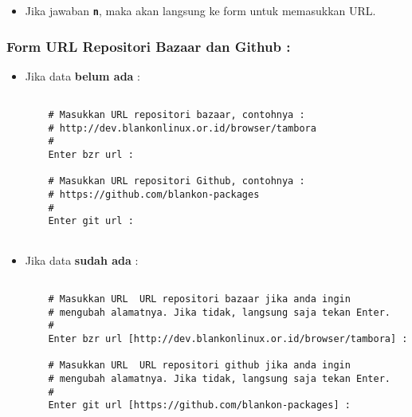 {\begin{itemize}
	Setelah form disini, maka akan tampilk hasil \textbf{Generate Key GnuPG} :
	
	\begin{lstlisting}[language=ShellBash]
	You want to enter different passphrase GnuPG ? [y or n] y
	Enter passphrase : pub   1024R/243741DF 2017-06-12
	Key fingerprint = 8891 3EF3 6E21 C298 B7B6  0F0A 1380 3397 2437 41DF
	uid                  Achmad Yusri Afandi <yusrideb@cpan.org>
	sub   1024R/EF69A466 2017-06-12
	\end{lstlisting}
	
	\item Jika jawaban \textbf{\texttt{n}}, maka akan langsung ke form untuk memasukkan URL.
	
\end{itemize}

\subsubsection{Form URL Repositori Bazaar dan Github :}

\begin{itemize}
	\item Jika data \textbf{belum ada} :
	
	\begin{lstlisting}[language=ShellBash2]
	
	# Masukkan URL repositori bazaar, contohnya :
	# http://dev.blankonlinux.or.id/browser/tambora
	#
	Enter bzr url : 
	
	# Masukkan URL repositori Github, contohnya :
	# https://github.com/blankon-packages
	#
	Enter git url : 
	
	\end{lstlisting}
	
	\item Jika data \textbf{sudah ada} :
	
	\begin{lstlisting}[language=ShellBash2]
	
	# Masukkan URL  URL repositori bazaar jika anda ingin 
	# mengubah alamatnya. Jika tidak, langsung saja tekan Enter.
	#
	Enter bzr url [http://dev.blankonlinux.or.id/browser/tambora] : 
	
	# Masukkan URL  URL repositori github jika anda ingin 
	# mengubah alamatnya. Jika tidak, langsung saja tekan Enter.
	#
	Enter git url [https://github.com/blankon-packages] : 
	
	\end{lstlisting}
	
\end{itemize}

}
